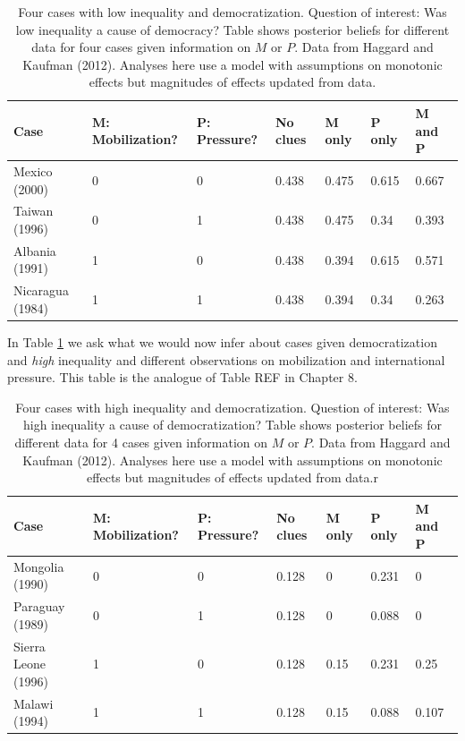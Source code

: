 \documentclass[
  12pt,
]{book}
\begin{document}
\begin{table}

\caption{\label{tab:HK10cases1}Four cases with low inequality and  democratization. Question of interest: Was low inequality a cause of democracy? Table shows posterior beliefs for different data for four cases given information on $M$ or $P$. Data from Haggard and Kaufman (2012). Analyses here use a model with assumptions on monotonic effects but magnitudes of effects updated from data.}
\centering
\begin{tabular}[t]{l|l|l|l|l|l|l}
\hline
Case & M: Mobilization? & P: Pressure? & No clues & M only & P only & M and P\\
\hline
Mexico (2000) & 0 & 0 & 0.438 & 0.475 & 0.615 & 0.667\\
\hline
Taiwan (1996) & 0 & 1 & 0.438 & 0.475 & 0.34 & 0.393\\
\hline
Albania (1991) & 1 & 0 & 0.438 & 0.394 & 0.615 & 0.571\\
\hline
Nicaragua (1984) & 1 & 1 & 0.438 & 0.394 & 0.34 & 0.263\\
\hline
\end{tabular}
\end{table}

In Table \ref{tab:HK10cases1} we ask what we would now infer about cases given democratization and \emph{high} inequality and different observations on mobilization and international pressure. This table is the analogue of Table REF in Chapter 8.

\begin{table}

\caption{\label{tab:HK10cases2}Four cases with high inequality and  democratization. Question of interest: Was high inequality a cause of democratization? Table shows posterior beliefs for different data for 4 cases given information on $M$ or $P$. Data from Haggard and Kaufman (2012).  Analyses here use a model with assumptions on monotonic effects but magnitudes of effects updated from data.r}
\centering
\begin{tabular}[t]{l|l|l|l|l|l|l}
\hline
Case & M: Mobilization? & P: Pressure? & No clues & M only & P only & M and P\\
\hline
Mongolia (1990) & 0 & 0 & 0.128 & 0 & 0.231 & 0\\
\hline
Paraguay (1989) & 0 & 1 & 0.128 & 0 & 0.088 & 0\\
\hline
Sierra Leone (1996) & 1 & 0 & 0.128 & 0.15 & 0.231 & 0.25\\
\hline
Malawi (1994) & 1 & 1 & 0.128 & 0.15 & 0.088 & 0.107\\
\hline
\end{tabular}
\end{table}
\end{document}
